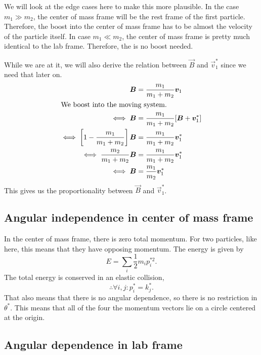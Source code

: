 \documentclass[11pt, english, fleqn, DIV=15, headinclude, BCOR=1.5cm]{scrartcl}
\begin{document}
We will look at the edge cases here to make this more plausible. In the case
$m_1 \gg m_2$, the center of mass frame will be the rest frame of the first
particle. Therefore, the boost into the center of mass frame has to be almost
the velocity of the particle itself. In case $m_1 \ll m_2$, the center of mass
frame is pretty much identical to the lab frame. Therefore, the is no boost
needed.

While we are at it, we will also derive the relation between $\vec B$ and $\vec
v_1^*$ since we need that later on.
\begin{align*}
    \vec B &= \frac{m_1}{m_1+m_2} \vec v_1 \\
    \intertext{%
        We boost into the moving system.
    }
    \iff \vec B &= \frac{m_1}{m_1+m_2} [\vec B + \vec v_1^*] \\
    \iff \sbr{1 - \frac{m_1}{m_1+m_2}} \vec B &= \frac{m_1}{m_1+m_2} \vec
    v_1^* \\
    \iff \frac{m_2}{m_1+m_2} \vec B &= \frac{m_1}{m_1+m_2} \vec v_1^* \\
    \iff \vec B &= \frac{m_1}{m_2} \vec v_1^*
\end{align*}
This gives us the proportionality between $\vec B$ and $\vec v_1^*$.

\subsection{Angular independence in center of mass frame}

In the center of mass frame, there is zero total momentum. For two particles,
like here, this means that they have opposing momentum. The energy is given by
\[
    E = \sum_i \frac 12 m_i p_i^{*2}.
\]
The total energy is conserved in an elastic collision,
\[
    \therefore \forall i, j\colon p_i^* = k_j^*.
\]
That also means that there is no angular dependence, so there is no restriction
in $\theta^*$. This means that all of the four the momentum vectors lie on a
circle centered at the origin.

\subsection{Angular dependence in lab frame}
\end{document}
